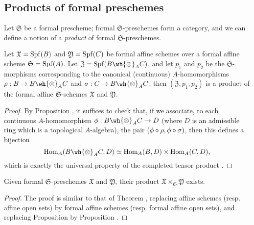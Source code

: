 \subsection{Products of formal preschemes}
\label{subsection:1.10.7}

\begin{env}[10.7.1]
\label{1.10.7.1}
Let $\mathfrak{S}$ be a formal prescheme; formal $\mathfrak{S}$-preschemes form a category, and we can define a notion of a \emph{product} of formal $\mathfrak{S}$-preschemes.
\end{env}

\begin{proposition}[10.7.2]
\label{1.10.7.2}
Let $\mathfrak{X}=\operatorname{Spf}(B)$ and $\mathfrak{Y}=\operatorname{Spf}(C)$ be formal affine schemes over a formal affine scheme $\mathfrak{S}=\operatorname{Spf}(A)$.
Let $\mathfrak{Z}=\Spf(B\wh{\otimes}_A C)$, and let $p_1$ and $p_2$ be the $\mathfrak{S}$-morphisms corresponding  to the canonical (continuous) $A$-homomorphisms $\rho: B\to B\wh{\otimes}_A C$ and $\sigma:C\to B\wh{\otimes}_A C$; then $(\mathfrak{Z},p_1,p_2)$ is a product of the formal affine $\mathfrak{S}$-schemes $\mathfrak{X}$ and $\mathfrak{Y}$.
\end{proposition}

\begin{proof}
\label{proof-1.10.7.2}
By Proposition , it suffices to check that, if we associate, to each continuous $A$-homomorphism $\vphi:B\wh{\otimes}_A C\to D$ (where $D$ is an admissible ring which is a topological $A$-algebra), the pair $(\phi\circ\rho,\phi\circ\sigma)$, then this defines a bijection
\[
  \Hom_A(B\wh{\otimes}_A C,D)\isoto\Hom_A(B,D)\times\Hom_A(C,D),
\]
which is exactly the universal property of the completed tensor product .
\end{proof}

\begin{proposition}[10.7.3]
\label{1.10.7.3}
Given formal $\mathfrak{S}$-preschemes $\mathfrak{X}$ and $\mathfrak{Y}$, their product $\mathfrak{X}\times_\mathfrak{S}\mathfrak{Y}$ exists.
\end{proposition}

\begin{proof}
\label{proof-1.10.7.3}
The proof is similar to that of Theorem , replacing affine schemes (resp. affine open sets) by formal affine schemes (resp. formal affine open sets), and replacing Proposition  by Proposition .
\end{proof}

